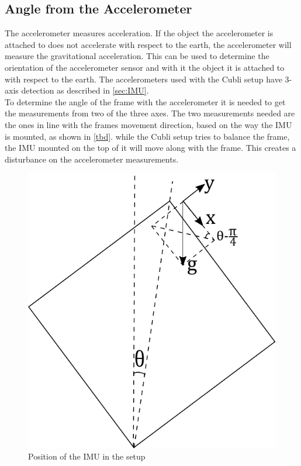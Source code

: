 \subsection{Angle from the Accelerometer}
The accelerometer measures acceleration. If the object the accelerometer is attached to does not accelerate with respect to the earth, the accelerometer will measure the gravitational acceleration. This can be used to determine the orientation of the accelerometer sensor and with it the object it is attached to with respect to the earth. The accelerometers used with the Cubli setup have 3-axis detection as described in \ref{sec:IMU}. \\
To determine the angle of the frame with the accelerometer it is needed to get the measurements from two of the three axes. The two measurements needed are the ones in line with the frames movement direction, based on the way the IMU is mounted, as shown in \ref{tbd}. 
while the Cubli setup tries to balance the frame, the IMU mounted on the top of it will move along with the frame. This creates a disturbance on the accelerometer measurements.
\begin{figure}[H]
	\centering
	\includegraphics[scale=0.5]{figures/accelerometer}
	\caption{Position of the IMU in the setup}
	\label{accelerometer}
\end{figure}\vspace{-5mm}

